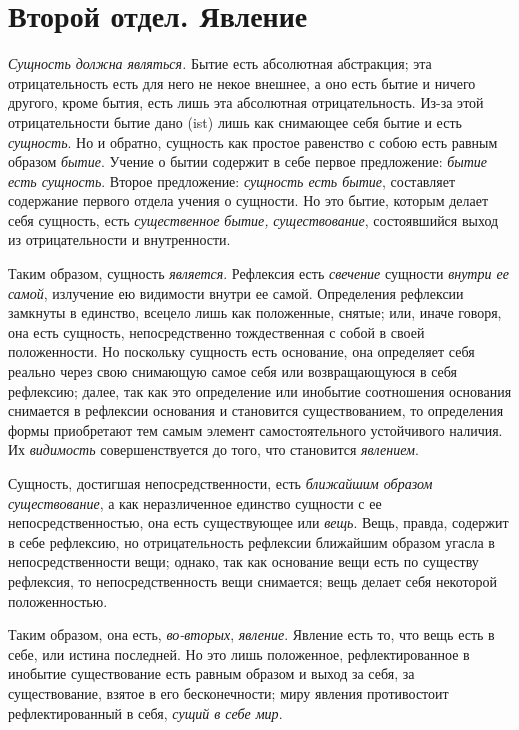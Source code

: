 \part[{\em Второй отдел} Явление]{Второй отдел. Явление}

{\em Сущность должна являться.}
Бытие есть абсолютная абстракция; эта отрицательность есть для него не некое
внешнее, а оно есть бытие и ничего другого, кроме бытия, есть лишь эта
абсолютная отрицательность. Из-за этой отрицательности бытие дано (ist)
лишь как снимающее себя бытие и есть {\em сущность}. Но
и обратно, сущность как простое равенство с собою есть равным образом
{\em бытие}. Учение о бытии содержит в себе первое
предложение: {\em бытие есть сущность}. Второе
предложение: {\em сущность есть бытие}, составляет
содержание первого отдела учения о сущности. Но это бытие, которым делает
себя сущность, есть {\em существенное бытие,}
{\em существование}, состоявшийся выход из
отрицательности и внутренности.

Таким образом, сущность {\em является}. Рефлексия есть
{\em свечение} сущности {\em внутри
ее самой}, излучение ею видимости внутри ее самой. Определения рефлексии
замкнуты в единство, всецело лишь как положенные, снятые; или, иначе
говоря, она есть сущность, непосредственно тождественная с собой в своей
положенности. Но поскольку сущность есть основание, она определяет себя
реально через свою снимающую самое себя или возвращающуюся в себя
рефлексию; далее, так как это определение или инобытие соотношения
основания снимается в рефлексии основания и становится существованием, то
определения формы приобретают тем самым элемент самостоятельного
устойчивого наличия. Их {\em видимость}
совершенствуется до того, что становится {\em явлением}.

Сущность, достигшая непосредственности, есть
{\em ближайшим образом существование}, а как
неразличенное единство сущности с ее непосредственностью, она есть
существующее или {\em вещь}. Вещь, правда, содержит в
себе рефлексию, но отрицательность рефлексии ближайшим образом угасла в
непосредственности вещи; однако, так как основание вещи есть по существу
рефлексия, то непосредственность вещи снимается; вещь делает себя некоторой
положенностью.

Таким образом, она есть, {\em во-вторых},
{\em явление}. Явление есть то, что вещь есть в себе,
или истина последней. Но это лишь положенное, рефлектированное в инобытие
существование есть равным образом и выход за себя, за существование, взятое
в его бесконечности; миру явления противостоит рефлектированный в себя,
{\em сущий в себе мир}.

